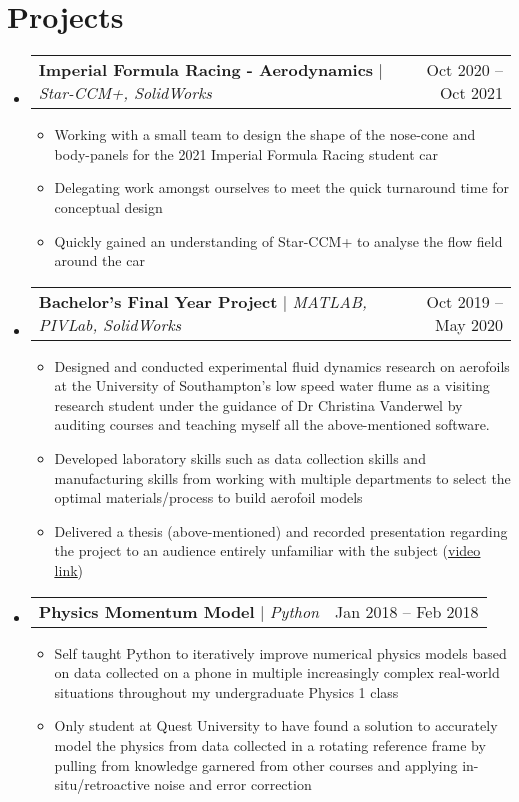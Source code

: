 \documentclass[a4paper,11pt]{article}
\makeatletter
\newcommand{\resumeItem}[1]{
  \item\small{
    {#1\vspace{-2pt}}
  }
}
\newcommand{\resumeProjectHeading}[2]{
    \item
    \begin{tabular*}{0.97\textwidth}{l@{\extracolsep{\fill}}r}
      \small#1 & #2 \\
    \end{tabular*}\vspace{-7pt}
}
\newcommand{\resumeSubHeadingListStart}{\begin{itemize}[leftmargin=0.15in, label={}]}
\newcommand{\resumeSubHeadingListEnd}{\end{itemize}}
\newcommand{\resumeItemListStart}{\begin{itemize}}
\newcommand{\resumeItemListEnd}{\end{itemize}\vspace{-5pt}}
\makeatother
\begin{document}
\section{Projects}
    \resumeSubHeadingListStart
    	\resumeProjectHeading
		    {\textbf{Imperial Formula Racing - Aerodynamics} $|$ \emph{Star-CCM+, SolidWorks}}{Oct 2020 -- Oct 2021}
		    \resumeItemListStart
		    \resumeItem{Working with a small team to design the shape of the nose-cone and body-panels for the 2021 Imperial Formula Racing student car}
		    \resumeItem{Delegating work amongst ourselves to meet the quick turnaround time for conceptual design}
		    \resumeItem{Quickly gained an understanding of Star-CCM+ to analyse the flow field around the car}
    	\resumeItemListEnd
      \resumeProjectHeading
          {\textbf{Bachelor's Final Year Project} $|$ \emph{MATLAB, PIVLab, SolidWorks}}{Oct 2019 -- May 2020}
          \resumeItemListStart
            \resumeItem{Designed and conducted experimental fluid dynamics research on aerofoils at the University of Southampton's low speed water flume as a visiting research student under the guidance of Dr Christina Vanderwel by auditing courses and teaching myself all the above-mentioned software.}
            \resumeItem{Developed laboratory skills such as data collection skills and manufacturing skills from working with multiple departments to select the optimal materials/process to build aerofoil models}
	    \resumeItem{Delivered a thesis (above-mentioned) and recorded presentation regarding the project to an audience entirely unfamiliar with the subject (\href{https://www.youtube.com/watch?v=ADNtDKkZBnE}{\underline{video link}})}
          \resumeItemListEnd
      \resumeProjectHeading
          {\textbf{Physics Momentum Model} $|$ \emph{Python}}{Jan 2018 -- Feb 2018}
          \resumeItemListStart
            \resumeItem{Self taught Python to iteratively improve numerical physics models based on data collected on a phone in multiple increasingly complex real-world situations throughout my undergraduate Physics 1 class}
            \resumeItem{Only student at Quest University to have found a solution to accurately model the physics from data collected in a rotating reference frame by pulling from knowledge garnered from other courses and applying in-situ/retroactive noise and error correction}
          \resumeItemListEnd
    \resumeSubHeadingListEnd
    
\end{document}
